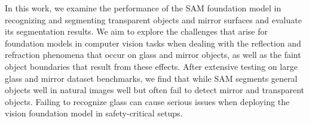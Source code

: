 \documentclass{article}
\begin{document}


In this work, we examine the performance of the SAM foundation model in recognizing and segmenting transparent objects and mirror surfaces and evaluate its segmentation results. We aim to explore the challenges that arise for foundation models in computer vision tasks when dealing with the reflection and refraction phenomena that occur on glass and mirror objects, as well as the faint object boundaries that result from these effects. After extensive testing on large glass and mirror dataset benchmarks, we find that while SAM segments general objects well in natural images well but often fail to detect mirror and transparent objects. Failing to recognize glass can cause serious issues when deploying the vision foundation model in safety-critical setups. 
\end{document}
